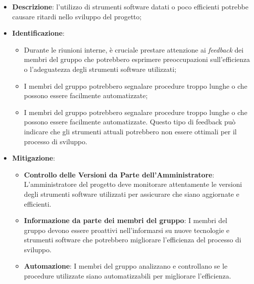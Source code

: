 \label{risk:strumenti software inadeguati}
\begin{itemize}
	\item \textbf{Descrizione}: l'utilizzo di strumenti software datati o poco
	      efficienti potrebbe causare ritardi nello sviluppo del progetto;

	\item \textbf{Identificazione}:
	      \begin{itemize}
		      \item Durante le riunioni interne, è cruciale prestare attenzione 
			  		ai \textit{feedback} dei membri del gruppo che potrebbero esprimere 
					preoccupazioni sull'efficienza o l'adeguatezza degli strumenti software utilizzati;

		      \item I membri del gruppo potrebbero segnalare procedure troppo lunghe o 
			  		che possono essere facilmente automatizzate;

		      \item I membri del gruppo potrebbero segnalare procedure troppo lunghe o 
			  		che possono essere facilmente automatizzate. 
					Questo tipo di feedback può indicare che gli strumenti attuali 
					potrebbero non essere ottimali per il processo di sviluppo.
	      \end{itemize}

	\item \textbf{Mitigazione}:
	      \begin{itemize}

			\item \textbf{Controllo delle Versioni da Parte dell'Amministratore}: 
				L'amministratore del progetto deve monitorare attentamente le versioni 
				degli strumenti software utilizzati per assicurare che siano aggiornate e efficienti.
				
			\item \textbf{Informazione da parte dei membri del gruppo}: 
				I membri del gruppo devono essere proattivi nell'informarsi su nuove tecnologie e 
				strumenti software che potrebbero migliorare l'efficienza del processo di sviluppo.

			\item \textbf{Automazione}: 
				I membri del gruppo analizzano e controllano se le procedure utilizzate siano 
				automatizzabili per migliorare l'efficienza.
	      \end{itemize}
\end{itemize}

